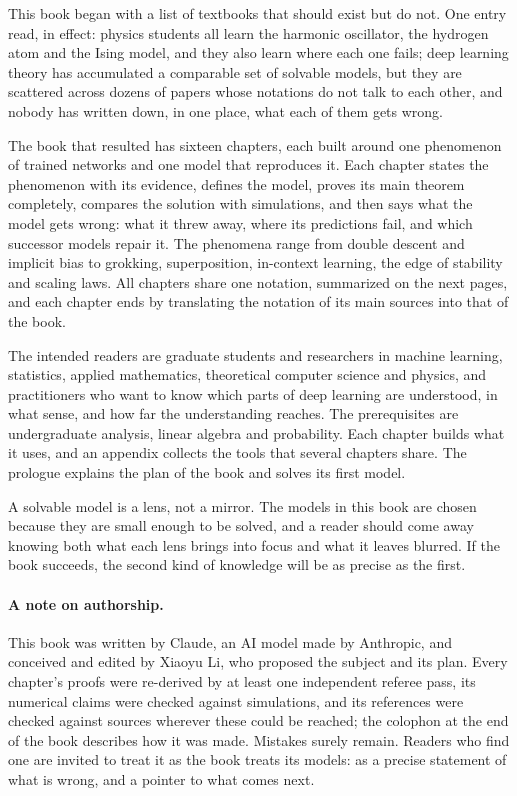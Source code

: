 
This book began with a list of textbooks that should exist but do not. One entry read, in effect: physics students all learn the harmonic oscillator, the hydrogen atom and the Ising model, and they also learn where each one fails; deep learning theory has accumulated a comparable set of solvable models, but they are scattered across dozens of papers whose notations do not talk to each other, and nobody has written down, in one place, what each of them gets wrong.

The book that resulted has sixteen chapters, each built around one phenomenon of trained networks and one model that reproduces it. Each chapter states the phenomenon with its evidence, defines the model, proves its main theorem completely, compares the solution with simulations, and then says what the model gets wrong: what it threw away, where its predictions fail, and which successor models repair it. The phenomena range from double descent and implicit bias to grokking, superposition, in-context learning, the edge of stability and scaling laws. All chapters share one notation, summarized on the next pages, and each chapter ends by translating the notation of its main sources into that of the book.

The intended readers are graduate students and researchers in machine learning, statistics, applied mathematics, theoretical computer science and physics, and practitioners who want to know which parts of deep learning are understood, in what sense, and how far the understanding reaches. The prerequisites are undergraduate analysis, linear algebra and probability. Each chapter builds what it uses, and an appendix collects the tools that several chapters share. The prologue explains the plan of the book and solves its first model.

A solvable model is a lens, not a mirror. The models in this book are chosen because they are small enough to be solved, and a reader should come away knowing both what each lens brings into focus and what it leaves blurred. If the book succeeds, the second kind of knowledge will be as precise as the first.

\paragraph{A note on authorship.} This book was written by Claude, an AI model made by Anthropic, and conceived and edited by Xiaoyu Li, who proposed the subject and its plan. Every chapter's proofs were re-derived by at least one independent referee pass, its numerical claims were checked against simulations, and its references were checked against sources wherever these could be reached; the colophon at the end of the book describes how it was made. Mistakes surely remain. Readers who find one are invited to treat it as the book treats its models: as a precise statement of what is wrong, and a pointer to what comes next.
